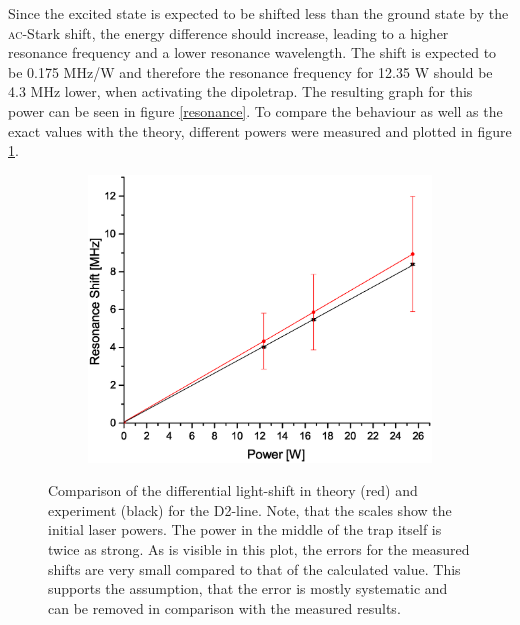 Since the excited state is expected to be shifted less than the ground state by the \textsc{ac}-Stark shift, the energy difference should increase, leading to a higher resonance frequency and a lower resonance wavelength. The shift is expected to be 0.175 MHz/W and therefore the resonance frequency for 12.35 W should be 4.3 MHz lower, when activating the dipoletrap. The resulting graph for this power can be seen in figure \ref{resonance}. To compare the behaviour as well as the exact values with the theory, different powers were measured and plotted in figure \ref{shifts}. 

\begin{figure}[h]
\centering
\begin{subfigure}[b]{0.8\textwidth}
                \includegraphics[width=\textwidth]{Shift2}
\end{subfigure}
\caption{Comparison of the differential light-shift in theory (red) and experiment (black) for the D2-line. Note, that the scales show the initial laser powers. The power in the middle of the trap itself is twice as strong. As is visible in this plot, the errors for the measured shifts are very small compared to that of the calculated value. This supports the assumption, that the error is mostly systematic and can be removed in comparison with the measured results.}
\label{shifts}
\end{figure}


